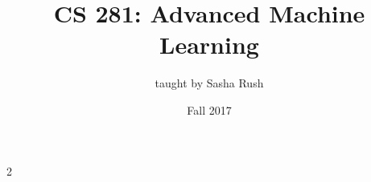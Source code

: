 \documentclass[11pt]{article}
\begin{document}
\title{CS 281: Advanced Machine Learning}
\date{Fall 2017}
\author{taught by Sasha Rush}
\maketitle


\tableofcontents
\eject

{2}

\end{document}
